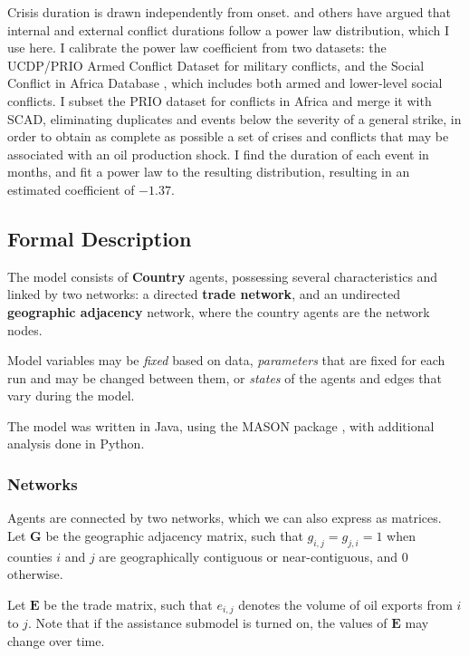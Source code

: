 \documentclass{llncs}
\begin{document}
Crisis duration is drawn independently from onset. \cite{cioffi_2004} and others have argued that internal and external conflict durations follow a power law distribution, which I use here. I calibrate the power law coefficient from two datasets: the UCDP/PRIO Armed Conflict Dataset \cite{lotta_2013} for military conflicts, and the Social Conflict in Africa Database \cite{hendrix_2013}, which includes both armed and lower-level social conflicts. I subset the PRIO dataset for conflicts in Africa and merge it with SCAD, eliminating duplicates and events below the severity of a general strike, in order to obtain as complete as possible a set of crises and conflicts that may be associated with an oil production  shock. I find the duration of each event in months, and fit a power law to the resulting distribution, resulting in an estimated coefficient of $\mathbf{-1.37}$.

\subsection{Formal Description}

The model consists of \textbf{Country} agents, possessing several characteristics and linked by two networks: a directed \textbf{trade network}, and an undirected \textbf{geographic adjacency} network, where the country agents are the network nodes.

Model variables may be \emph{fixed} based on data, \emph{parameters} that are fixed for each run and may be changed between them, or \emph{states} of the agents and edges that vary during the model.

The model was written in Java, using the MASON package \cite{luke_2005}, with additional analysis done in Python. 

\subsubsection{Networks}

Agents are connected by two networks, which we can also express as matrices. Let $\mathbf{G}$ be the geographic adjacency matrix, such that $g_{i,j}=g_{j,i}=1$ when counties $i$ and $j$ are geographically contiguous or near-contiguous, and $0$ otherwise. 

Let $\mathbf{E}$ be the trade matrix, such that $e_{i,j}$ denotes the volume of oil exports from $i$ to $j$. Note that if the assistance submodel is turned on, the values of $\mathbf{E}$ may change over time.
\end{document}
